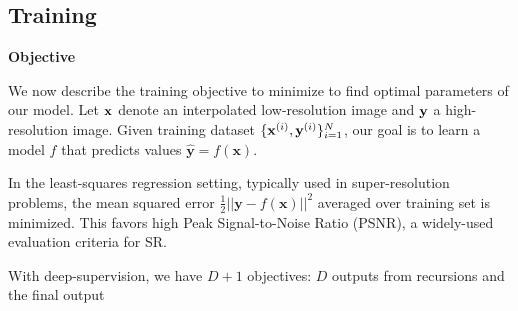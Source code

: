 \documentclass[10pt,twocolumn,letterpaper]{article}
\begin{document}
%
%
%
%

\subsection{Training}

\textbf{Objective}

We now describe the training objective to minimize to find optimal parameters of our model. Let ${\bf x}$ denote an interpolated low-resolution image and ${\bf y}$ a high-resolution image. 
Given training dataset $\{{\bf x}^{(i)},{\bf y}^{(i)}\}{}_{i=1}^{N}$, our goal is to learn a model $f$ that predicts values $\mathbf{\hat{y}}=f(\mathbf{x})$.

In the least-squares regression setting, typically used in super-resolution
problems, the mean squared error $\frac{1}{2}||\mathbf{y}-f(\mathbf{x})||^{2}$
averaged over training set is minimized. This favors high Peak Signal-to-Noise
Ratio (PSNR), a widely-used evaluation criteria for SR. 

With deep-supervision, we have $D+1$ objectives: $D$ outputs from recursions and the final output 
\end{document}
